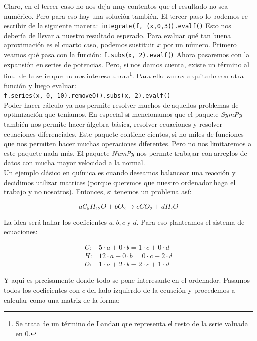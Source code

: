 \documentclass[10pt,letterpaper]{article}
\newcommand{\inlinecode}[1]{
\colorbox{light-gray}{\texttt{#1}}
}
\begin{document}
Claro, en el tercer caso no nos deja muy contentos que el resultado no sea num\'erico. Pero para eso hay una soluci\'on tambi\'en. El tercer paso lo podemos re-escribir de la siguiente manera: \inlinecode{integrate(f, (x,0,3)).evalf()} Esto nos deber\'ia de llevar a nuestro resultado esperado. Para evaluar qu\'e tan buena aproximaci\'on es el cuarto caso, podemos sustituir $x$ por un n\'umero. Primero veamos qu\'e pasa con la funci\'on: \inlinecode{f.subs(x, 2).evalf()} Ahora pasaremos con la expansi\'on en series de potencias. Pero, si nos damos cuenta, existe un t\'ermino al final de la serie que no nos interesa ahora\footnote{Se trata de un t\'ermino de Landau que representa el resto de la serie valuada en 0.}. Para ello vamos a quitarlo con otra funci\'on y luego evaluar:\\
\inlinecode{f.series(x, 0, 10).removeO().subs(x, 2).evalf()}\\

Poder hacer c\'alculo ya nos permite resolver muchos de aquellos problemas de optimizaci\'on que ten\'iamos. En especial si mencionamos que el paquete \emph{SymPy} tambi\'en nos permite hacer \'algebra b\'asica, resolver ecuaciones y resolver ecuaciones diferenciales. Este paquete contiene cientos, si no miles de funciones que nos permiten hacer muchas operaciones diferentes. Pero no nos limitaremos a este paquete nada m\'as. El paquete \emph{NumPy} nos permite trabajar con arreglos de datos con mucha mayor velocidad a la normal.\\

Un ejemplo cl\'asico en qu\'imica es cuando deseamos balancear una reacci\'on y decidimos utilizar matrices (porque queremos que nuestro ordenador haga el trabajo y no nosotros). Entonces, si tenemos un problema as\'i:

\begin{equation}
a C_5 H_{12} O + b O_2 \longrightarrow c CO_2 + d H_2 O
\end{equation}

La idea ser\'a hallar los coeficientes $a, b, c$ y $d$. Para eso planteamos el sistema de ecuaciones:

\begin{eqnarray}
C: & 5 \cdot a + 0 \cdot b = 1 \cdot c + 0 \cdot d\\
H: & 12 \cdot a + 0 \cdot b = 0 \cdot c + 2 \cdot d\\
O: & 1 \cdot a + 2 \cdot b = 2 \cdot c + 1 \cdot d
\end{eqnarray}

Y aqu\'i es precisamente donde todo se pone interesante en el ordenador. Pasamos todos los coeficientes con $c$ del lado izquierdo de la ecuaci\'on y procedemos a calcular como una matriz de la forma:
\end{document}
